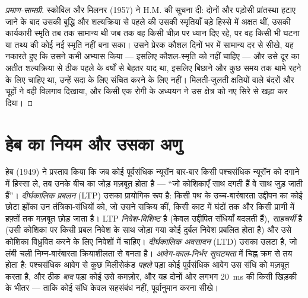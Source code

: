 \begin{proof}[प्रमाण-सामग्री]
स्कोविल और मिलनर (1957) ने H.M. की सूचना दी: दोनों  और
पड़ोसी प्रांतस्था हटाए जाने के बाद उसकी बुद्धि और शल्यक्रिया से पहले की
उसकी स्मृतियाँ बड़े हिस्से में अक्षत थीं, उसकी कार्यकारी स्मृति तब तक
सामान्य थी जब तक वह किसी चीज़ पर ध्यान दिए रहे, पर वह किसी भी घटना या
तथ्य की कोई नई स्मृति नहीं बना सका। उसने प्रेरक कौशल दिनों भर में
सामान्य दर से सीखे, यह नकारते हुए कि उसने कभी अभ्यास किया --- इसलिए
कौशल-स्मृति को  नहीं चाहिए --- और उसे दूर का अतीत
शल्यक्रिया से ठीक पहले के वर्षों से बेहतर याद था, इसलिए 
 बिछाने और कुछ समय तक थामे रहने के लिए चाहिए था,
उन्हें सदा के लिए संचित करने के लिए नहीं। मिलती-जुलती क्षतियों वाले
बंदरों और चूहों ने वही विलगाव दिखाया, और किसी एक रोगी के अध्ययन ने उस
क्षेत्र को नए सिरे से खड़ा कर दिया।
\end{proof}

\section{हेब का नियम और उसका अणु}

\begin{definition}\label{def:b3:learning-memory:ltp}
हेब (1949) ने प्रस्ताव किया कि जब कोई पूर्वसंधिक न्यूरॉन बार-बार किसी
पश्चसंधिक न्यूरॉन को दगाने में हिस्सा ले, तब उनके बीच का जोड़ मज़बूत
होता है --- ``जो कोशिकाएँ साथ दगती हैं वे साथ जुड़ जाती हैं''।
\emph{दीर्घकालिक प्रबलन} (LTP) उसका प्रायोगिक रूप है: किसी पथ के
उच्च-बारंबारता उद्दीपन का कोई छोटा झोंका उन तंत्रिका-संधियों को, जो
उसने सक्रिय कीं, किसी काट में घंटों तक और किसी प्राणी में हफ़्तों तक
मज़बूत छोड़ जाता है। LTP \emph{निवेश-विशिष्ट} है (केवल उद्दीपित संधियाँ
बदलती हैं), \emph{साहचर्यी} है (उसी कोशिका पर किसी प्रबल निवेश के साथ
जोड़ा गया कोई दुर्बल निवेश प्रबलित होता है) और उसे कोशिका विध्रुवित
करने के लिए निवेशों में \emph{} चाहिए। \emph{दीर्घकालिक
अवसादन} (LTD) उसका उलटा है, जो लंबी चली निम्न-बारंबारता क्रियाशीलता से
बनता है। \emph{आवेग-काल-निर्भर सुघट्यता} में चिह्न क्रम से तय होता है:
पश्चसंधिक आवेग से कुछ मिलीसेकंड \emph{पहले} पड़ा कोई पूर्वसंधिक आवेग उस
संधि को मज़बूत करता है, और ठीक \emph{बाद} पड़ा कोई उसे कमज़ोर, और यह
दोनों ओर लगभग \qty{20}{ms} की किसी खिड़की के भीतर --- ताकि कोई संधि
केवल सहसंबंध नहीं, पूर्वानुमान करना सीखे।
\end{definition}

